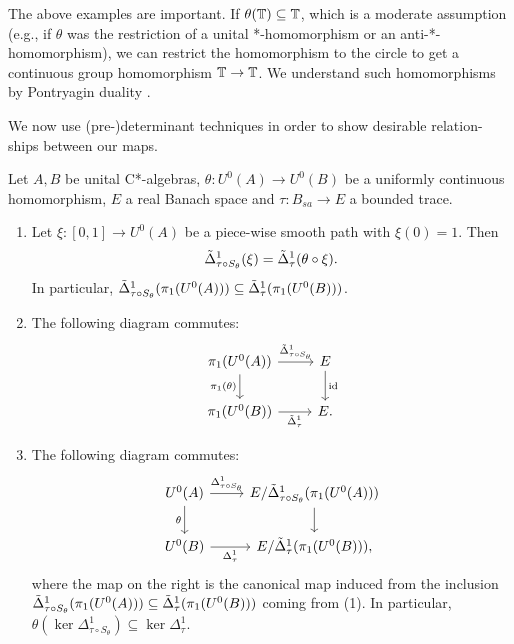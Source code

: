 \documentclass[12pt]{amsart}
\begin{document}
The above examples are important. If $\theta(\mathbb{T}) \subseteq \mathbb{T}$, which is a moderate assumption (e.g., if $\theta$ was the restriction of a unital *-homomorphism or an anti-*-homomorphism), we can restrict the homomorphism to the circle to get a continuous group homomorphism $\mathbb{T} \to \mathbb{T}$. We understand such homomorphisms by Pontryagin duality \cite[Chapter 4]{Follandbook16}. 

We now use (pre-)determinant techniques in order to show desirable relation\hyp{}ships between our maps.

\begin{prop}\label{prop:pre-det-commuting-diagrams}
Let $A,B$ be unital C*-algebras, $\theta: U^0(A) \to U^0(B)$ be a uniformly continuous homomorphism, $E$ a real Banach space and $\tau: B_{sa} \to E$ a bounded trace.
\begin{enumerate}
\item Let $\xi: [0,1] \to U^0(A)$ be a piece-wise smooth path with $\xi(0) = 1$. Then
\begin{equation}
\tilde{\Delta}_{\tau \circ S_\theta}^1(\xi) = \tilde{\Delta}_\tau^1(\theta \circ \xi).
\end{equation}
In particular, $\tilde{\Delta}_{\tau\circ S_\theta}^1(\pi_1(U^0(A))) \subseteq \tilde{\Delta}_\tau^1(\pi_1(U^0(B)))$. 
\item The following diagram commutes:
\begin{equation}
\begin{tikzcd}
\pi_1(U^0(A)) \arrow[d, "\pi_1(\theta)"'] \arrow[r, "\tD_{\tau \circ S_\theta}^1"] & E \arrow[d, "\id"] \\
\pi_1(U^0(B)) \arrow[r, "\tD_\tau^1"']                                             & E          .
\end{tikzcd}
\end{equation}
\item The following diagram commutes:
\begin{equation}\label{eq:det-commutation}
\begin{tikzcd}
U^0(A) \arrow[r, "\Delta_{\tau \circ S_\theta}^1"] \arrow[d, "\theta"'] & E/\tD_{\tau\circ S_\theta}^1(\pi_1(U^0(A))) \arrow[d] \\
U^0(B) \arrow[r, "\Delta_\tau^1"']                                      & E/\tD_\tau^1(\pi_1(U^0(B)))           ,              
\end{tikzcd}
\end{equation}
where the map on the right is the canonical map induced from the inclusion  $\tilde{\Delta}_{\tau \circ S_\theta}^1(\pi_1(U^0(A))) \subseteq \tilde{\Delta}_\tau^1(\pi_1(U^0(B)))$ coming from (1).
In particular, $\theta(\ker \Delta_{\tau\circ S_\theta}^1) \subseteq \ker \Delta_\tau^1$. 


\end{enumerate}
\end{prop}
\end{document}
